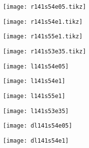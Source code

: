 \begin{figure}
\centering
\begin{subfigure}{.24\textwidth}
  \centering
  \texttt{[image: r141s54e05.tikz]}
  \label{fig:rdf141fcc} 
\end{subfigure}
\begin{subfigure}{.24\textwidth}
  \centering
  \texttt{[image: r141s54e1.tikz]}
  \label{fig:rdf14phase1} 
\end{subfigure}
\begin{subfigure}{.24\textwidth}
  \centering
  \texttt{[image: r141s55e1.tikz]}
  \label{fig:rdf14phase2} 
\end{subfigure}
\begin{subfigure}{.24\textwidth}
  \centering
  \texttt{[image: r141s53e35.tikz]}
  \label{fig:rdf14qc} 
\end{subfigure}
\begin{subfigure}{.24\textwidth}
  \centering
   \texttt{[image: l141s54e05]}
  \label{fig:bond141fcc}  
\end{subfigure}
\begin{subfigure}{.24\textwidth}
  \centering
   \texttt{[image: l141s54e1]}
  \label{fig:bond141phase1}  
\end{subfigure}
\begin{subfigure}{.24\textwidth}
  \centering
   \texttt{[image: l141s55e1]}
  \label{fig:bond141phase2}  
\end{subfigure}
\begin{subfigure}{.24\textwidth}
  \centering
   \texttt{[image: l141s53e35]}
  \label{fig:bond141qc}  
\end{subfigure}
\begin{subfigure}{.24\textwidth}
  \centering
  \texttt{[image: dl141s54e05]}
  \caption{}
  \label{fig:diff141fcc} 
\end{subfigure}
\begin{subfigure}{.24\textwidth}
  \centering
  \texttt{[image: dl141s54e1]}
  \caption{}
  \label{fig:diff141phase1} 
\end{subfigure}
\begin{subfigure}{.24\textwidth}

\end{subfigure}
\end{figure}

